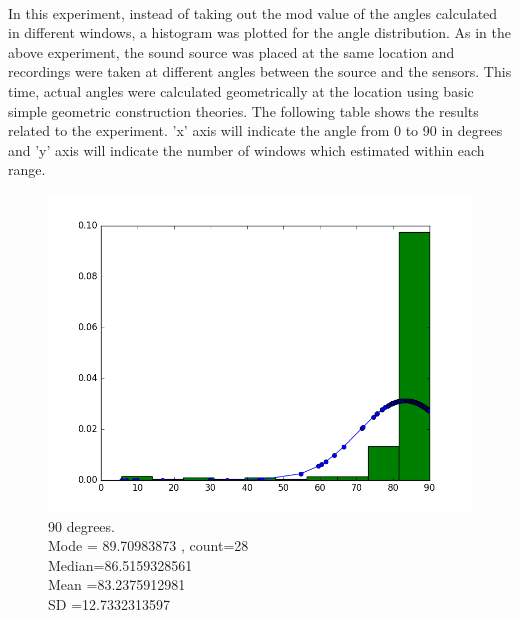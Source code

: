 \documentclass[12pt]{article}
\numberwithin{figure}{section}
\numberwithin{table}{section}
\begin{document}
\paragraph{}
In this experiment, instead of taking out the mod value of the angles calculated in different windows, a histogram was plotted for the angle distribution. As in the above experiment, the sound source was placed at the same location and recordings were taken at different angles between the source and the sensors. This time, actual angles were calculated geometrically at the location using basic simple geometric construction theories. The following table shows the results related to the experiment. 'x' axis will indicate the angle from 0 to 90 in degrees and 'y' axis will indicate the number of windows which estimated within each range.  


\begin{figure}[H]
  \centering
  \begin{minipage}[b]{0.4\textwidth}
    \includegraphics[width=\textwidth]{angle90.png}
    \caption[Estimation at angle 90 degrees]{90 degrees.
	\\\hspace{\textwidth}Mode   = 89.70983873 , count=28
	\\\hspace{\textwidth}	Median=86.5159328561
	\\\hspace{\textwidth}	Mean   =83.2375912981
	\\\hspace{\textwidth}	SD       =12.7332313597   
    }
  \end{minipage}

\end{figure}
\end{document}

